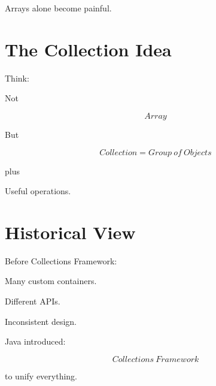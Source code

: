 \documentclass[11pt,a4paper]{book}
\begin{document}

Arrays alone become painful.


\section{The Collection Idea}

Think:


Not

\[
Array
\]


But


\[
Collection
=
Group\ of\ Objects
\]


plus


Useful operations.


\section{Historical View}

Before Collections Framework:


Many custom containers.


Different APIs.


Inconsistent design.


Java introduced:

\[
Collections\ Framework
\]


to unify everything.
\end{document}
